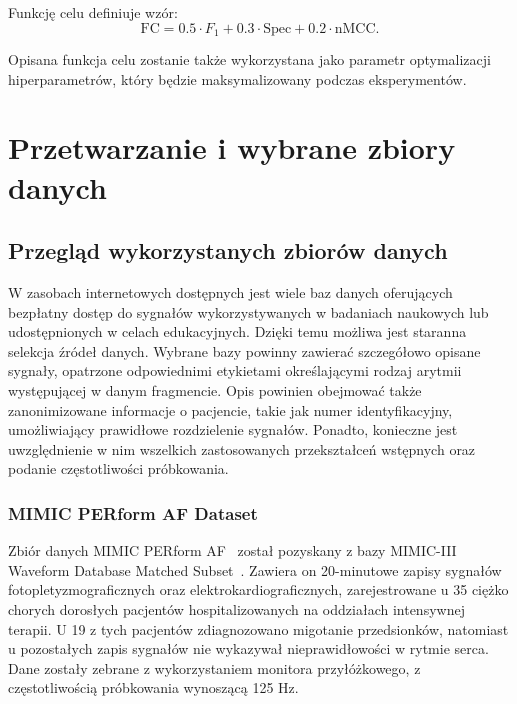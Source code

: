 \documentclass[a4paper,twoside,12pt]{book}
\begin{document}
\begin{itemize}
	      Funkcję celu definiuje wzór:
	      \begin{equation}
		      \text{FC} = 0.5 \cdot F_1 + 0.3 \cdot \text{Spec} +  0.2 \cdot \text{nMCC}.
	      \end{equation}

	      Opisana funkcja celu zostanie także wykorzystana jako parametr optymalizacji hiperparametrów, który będzie maksymalizowany podczas eksperymentów.

\end{itemize}















\chapter{Przetwarzanie i wybrane zbiory danych}
\section{Przegląd wykorzystanych zbiorów danych}
W zasobach internetowych dostępnych jest wiele baz danych oferujących bezpłatny dostęp do sygnałów wykorzystywanych w badaniach naukowych lub udostępnionych w celach edukacyjnych. Dzięki temu możliwa jest staranna selekcja źródeł danych. Wybrane bazy powinny zawierać szczegółowo opisane sygnały, opatrzone odpowiednimi etykietami określającymi rodzaj arytmii występującej w danym fragmencie. Opis powinien obejmować także zanonimizowane informacje o pacjencie, takie jak numer identyfikacyjny, umożliwiający prawidłowe rozdzielenie sygnałów. Ponadto, konieczne jest uwzględnienie w nim wszelkich zastosowanych przekształceń wstępnych oraz podanie częstotliwości próbkowania.

\subsection*{MIMIC PERform AF Dataset}
Zbiór danych MIMIC PERform AF~\cite{mimic_perform_af} został pozyskany z bazy MIMIC-III Waveform Database Matched Subset~\cite{mimiciii_waveform_matched}. Zawiera on 20-minutowe zapisy sygnałów fotopletyzmograficznych oraz elektrokardiograficznych, zarejestrowane u 35 ciężko chorych dorosłych pacjentów hospitalizowanych na oddziałach intensywnej terapii. U 19 z tych pacjentów zdiagnozowano migotanie przedsionków, natomiast u pozostałych zapis sygnałów nie wykazywał nieprawidłowości w rytmie serca. Dane zostały zebrane z wykorzystaniem monitora przyłóżkowego, z częstotliwością próbkowania wynoszącą 125 Hz.
\end{document}
